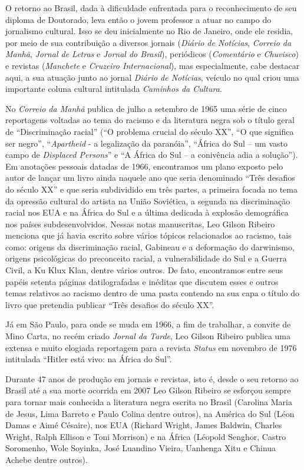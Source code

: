 \documentclass[
  letterpaper,
  DIV=11,
  numbers=noendperiod]{scrreprt}
\begin{document}
O retorno ao Brasil, dada à dificuldade enfrentada para o reconhecimento
de seu diploma de Doutorado, leva então o jovem professor a atuar no
campo do jornalismo cultural. Isso se deu inicialmente no Rio de
Janeiro, onde ele residia, por meio de sua contribuição a diversos
jornais (\emph{Diário de Notícias}, \emph{Correio da Manhã},
\emph{Jornal de Letras} e \emph{Jornal do Brasil}), periódicos
(\emph{Comentário} e \emph{Chuvisco}) e revistas (\emph{Manchete} e
\emph{Cruzeiro Internacional}), mas especialmente, cabe destacar aqui, a
sua atuação junto ao jornal \emph{Diário de Notícias}, veículo no qual
criou uma importante coluna cultural intitulada \emph{Caminhos da
Cultura}.

No \emph{Correio da Manhã} publica de julho a setembro de 1965 uma série
de cinco reportagens voltadas ao tema do racismo e da literatura negra
sob o título geral de ``Discriminação racial'' (``O problema crucial do
século XX'', ``O que significa ser negro'', ``\emph{Apartheid} - a
legalização da paranóia'', ``África do Sul -- um vasto campo de
\emph{Displaced Persons}'' e ``A África do Sul -- a conivência adia a
solução''). Em anotações pessoais datadas de 1966, encontramos um plano
exposto pelo autor de lançar um livro ainda naquele ano que seria
denominado ``Três desafios do século XX'' e que seria subdividido em
três partes, a primeira focada no tema da opressão cultural do artista
na União Soviética, a segunda na discriminação racial nos EUA e na
África do Sul e a última dedicada à explosão demográfica nos países
subdesenvolvidos. Nessas notas manuscritas, Leo Gilson Ribeiro menciona
que já havia escrito sobre vários tópicos relacionados ao racismo, tais
como: origens da discriminação racial, Gabineau e a deformação do
darwinismo, origens psicológicas do preconceito racial, a
vulnerabilidade do Sul e a Guerra Civil, a Ku Klux Klan, dentre vários
outros. De fato, encontramos entre seus papéis setenta páginas
datilografadas e inéditas que discutem esses e outros temas relativos ao
racismo dentro de uma pasta contendo na sua capa o título do livro que
pretendia publicar ``Três desafios do século XX''.

Já em São Paulo, para onde se muda em 1966, a fim de trabalhar, a
convite de Mino Carta, no recém criado \emph{Jornal da Tarde}, Leo
Gilson Ribeiro publica uma extensa e muito elogiada reportagem para a
revista \emph{Status} em novembro de 1976 intitulada ``Hitler está vivo:
na África do Sul''.

Durante 47 anos de produção em jornais e revistas, isto é, desde o seu
retorno ao Brasil até a sua morte ocorrida em 2007 Leo Gilson Ribeiro se
esforçou sempre para tornar mais conhecida a literatura negra escrita no
Brasil (Carolina Maria de Jesus, Lima Barreto e Paulo Colina dentre
outros), na América do Sul (Léon Damas e Aimé Césaire), nos EUA (Richard
Wright, James Baldwin, Charles Wright, Ralph Ellison e Toni Morrison) e
na África (Léopold Senghor, Castro Soromenho, Wole Soyinka, José
Luandino Vieira, Uanhenga Xitu e Chinua Achebe dentre outros).
\end{document}
